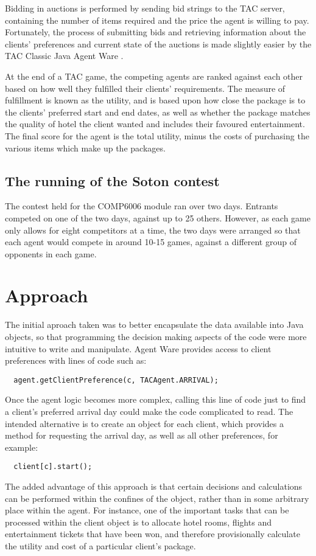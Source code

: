 \documentclass{acm_proc_article-sp}
\begin{document}
 Bidding in auctions is performed by sending bid strings to the TAC server, containing the number of items required and the price the agent is willing to pay.  Fortunately, the process of submitting bids and retrieving information about the clients' preferences and current state of the auctions is made slightly easier by the TAC Classic Java Agent Ware \cite{SICE2007c}.
 
 At the end of a TAC game, the competing agents are ranked against each other based on how well they fulfilled their clients' requirements.  The measure of fulfillment is known as the utility, and is based upon how close the package is to the clients' preferred start and end dates, as well as whether the package matches the quality of hotel the client wanted and includes their favoured entertainment.  The final score for the agent is the total utility, minus the costs of purchasing the various items which make up the packages.
 
 \subsection{The running of the Soton contest}
 
 The contest held for the COMP6006 module ran over two days.  Entrants competed on one of the two days, against up to 25 others.  However, as each game only allows for eight competitors at a time, the two days were arranged so that each agent would compete in around 10-15 games, against a different group of opponents in each game.
 
\section{Approach}

 The initial aproach taken was to better encapsulate the data available into Java objects, so that programming the decision making aspects of the code were more intuitive to write and manipulate.  Agent Ware provides access to client preferences with lines of code such as:
 \begin{verbatim}
  agent.getClientPreference(c, TACAgent.ARRIVAL);
 \end{verbatim}
 Once the agent logic becomes more complex, calling this line of code just to find a client's preferred arrival day could make the code complicated to read.  The intended alternative is to create an object for each client, which provides a method for requesting the arrival day, as well as all other preferences, for example:
 \begin{verbatim}
  client[c].start();
 \end{verbatim}
 The added advantage of this approach is that certain decisions and calculations can be performed within the confines of the object, rather than in some arbitrary place within the agent.  For instance, one of the important tasks that can be processed within the client object is to allocate hotel rooms, flights and entertainment tickets that have been won, and therefore provisionally calculate the utility and cost of a particular client's package.
 
\end{document}
